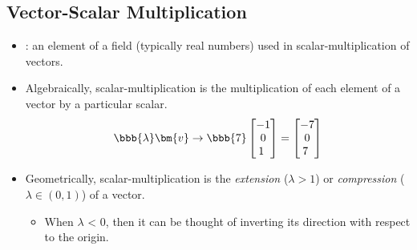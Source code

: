 \begin{itemize}
  \subsection{Vector-Scalar Multiplication}\label{Vector-Scalar Multiplication}
  \begin{itemize}
      \item {}: an element of a field (typically real numbers) used in scalar-multiplication of vectors. 
      \item Algebraically, scalar-multiplication is the multiplication of each element of a vector by a particular scalar.
      \[%
      \bbb{\lambda} \bm{v} \rightarrow \bbb{7} \begin{bmatrix}
      -1 \\
      0 \\
      1 \
      \end{bmatrix} = \begin{bmatrix}
      -7 \\
      0 \\
      7 \
      \end{bmatrix}
      \]%
      \item Geometrically, scalar-multiplication is the \emph{extension} (\(\lambda > 1\)) or \emph{compression} (\(\lambda\in(0,1)\)) of a vector.
        \begin{itemize}
          \item When \(\lambda \) < 0, then it can be thought of inverting its direction with respect to the origin.  
        \end{itemize}
  \end{itemize}  
\end{itemize}

